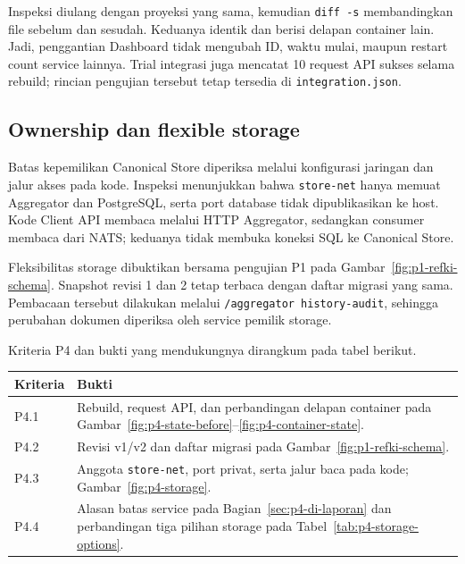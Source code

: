 Inspeksi diulang dengan proyeksi yang sama, kemudian \texttt{diff -s} membandingkan file sebelum dan sesudah. Keduanya identik dan berisi delapan container lain. Jadi, penggantian Dashboard tidak mengubah ID, waktu mulai, maupun restart count service lainnya. Trial integrasi juga mencatat 10 request API sukses selama rebuild; rincian pengujian tersebut tetap tersedia di \texttt{integration.json}.

\subsection{Ownership dan flexible storage}
Batas kepemilikan Canonical Store diperiksa melalui konfigurasi jaringan dan jalur akses pada kode. Inspeksi menunjukkan bahwa \texttt{store-net} hanya memuat Aggregator dan PostgreSQL, serta port database tidak dipublikasikan ke host. Kode Client API membaca melalui HTTP Aggregator, sedangkan consumer membaca dari NATS; keduanya tidak membuka koneksi SQL ke Canonical Store.

Fleksibilitas storage dibuktikan bersama pengujian P1 pada Gambar~\ref{fig:p1-refki-schema}. Snapshot revisi 1 dan 2 tetap terbaca dengan daftar migrasi yang sama. Pembacaan tersebut dilakukan melalui \texttt{/aggregator history-audit}, sehingga perubahan dokumen diperiksa oleh service pemilik storage.

Kriteria P4 dan bukti yang mendukungnya dirangkum pada tabel berikut.
\begin{table}[H]
\centering\small
\begin{tabularx}{\textwidth}{>{\raggedright\arraybackslash}p{2cm}Y}
\toprule
Kriteria & Bukti \\
\midrule
P4.1 & Rebuild, request API, dan perbandingan delapan container pada Gambar~\ref{fig:p4-state-before}--\ref{fig:p4-container-state}. \\
P4.2 & Revisi v1/v2 dan daftar migrasi pada Gambar~\ref{fig:p1-refki-schema}. \\
P4.3 & Anggota \texttt{store-net}, port privat, serta jalur baca pada kode; Gambar~\ref{fig:p4-storage}. \\
P4.4 & Alasan batas service pada Bagian~\ref{sec:p4-di-laporan} dan perbandingan tiga pilihan storage pada Tabel~\ref{tab:p4-storage-options}. \\
\bottomrule
\end{tabularx}
\end{table}

